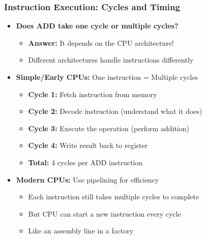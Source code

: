 \begin{frame}
\frametitle{Instruction Execution: Cycles and Timing}
\begin{itemize}
    \item \textbf{Does ADD take one cycle or multiple cycles?}
    \begin{itemize}
        \item \textbf{Answer:} It depends on the CPU architecture!
        \item Different architectures handle instructions differently
    \end{itemize}
    \item \textbf{Simple/Early CPUs:} One instruction = Multiple cycles
    \begin{itemize}
        \item \textbf{Cycle 1:} Fetch instruction from memory
        \item \textbf{Cycle 2:} Decode instruction (understand what it does)
        \item \textbf{Cycle 3:} Execute the operation (perform addition)
        \item \textbf{Cycle 4:} Write result back to register
        \item \textbf{Total:} 4 cycles per ADD instruction
    \end{itemize}
    \item \textbf{Modern CPUs:} Use pipelining for efficiency
    \begin{itemize}
        \item Each instruction still takes multiple cycles to complete
        \item But CPU can start a new instruction every cycle
        \item Like an assembly line in a factory
    \end{itemize}
\end{itemize}
\end{frame}

